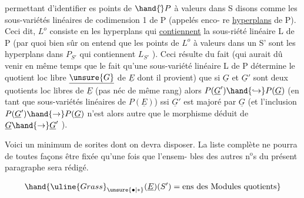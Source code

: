  

permettant d'identifier es points de $\hand{\check{}}P$\hand{,} à valeurs dans  S disons\hand{,}
comme les sous-variétés linéaires de codimension 1 de P (appelés enco-%
re \uline{hyperplans} de P). Ceci dit, $L^{o}$ consiste en les hyperplans qui
\uline{contiennent} la sous-riété linéaire L de P (par quoi bien sûr on
entend que les points de $L^{o}$  à valeurs dans un S' sont les
hyperplans dans $P_{S'}$ qui contiennent $L_{S'}$ ). Ceci résulte du fait 
\placedmargin{|}(qui aurait dû venir en même temps que le fait qu'une sous-variété linéaire L de P\hand{,}
détermine le quotient loc libre $\underline{\unsure{G}}$ de $\underline{E}$ dont il provient) que si
$\underline{G}$ et $\underline{G}'$ sont deux quotients loc libres de $\underline{E}$ (pas néc de même rang)
alors $P(\underline{G}')\hand{\hookrightarrow}P(\underline{G})$ (en tant que sous-variétés linéaires de $P(\underline{E})$) ssi
$\underline{G}'$ est majoré par $\underline{G}$ (et l'inclusion $P(\underline{G}')\hand{\rightarrow}P(\underline{G})$ n'est alors autre
que le morphisme déduit de $\underline{G}\hand{\rightarrow}\underline{G}'$ ).

Voici un minimum de sorites dont on devra disposer. La liste
complète ne pourra de toutes façons être fixée qu'une fois que l'ensem-%
bles des autres n$^{\text{o}}$s du présent paragraphe sera rédigé.



\[ \hand{\uline{Grass}_{\unsure{\bullet|*}}(\underline{E})(S') = \text{ens des Modules quotients}} \]

\hand{sections de \uline{Grass}$_{\unsure{*}}(\underline{E})$ sur S [NB. le}

